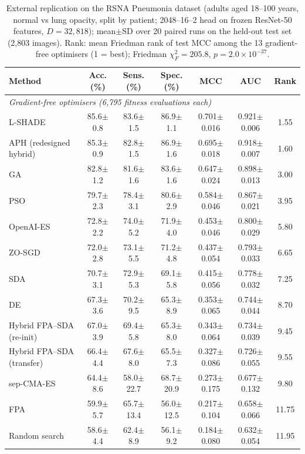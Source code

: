 \begin{table}[!t]
\centering
\caption{External replication on the RSNA Pneumonia dataset (adults aged 18--100 years, normal vs lung opacity, split by patient; 2048--16--2 head on frozen ResNet-50 features, $D=32{,}818$); mean$\pm$SD over 20 paired runs on the held-out test set (2,803 images). Rank: mean Friedman rank of test MCC among the 13 gradient-free optimisers (1 = best); Friedman $\chi^2_F=205.8$, $p=2.0\times 10^{-37}$.}
\label{tab:rsna}
\footnotesize
\setlength{\tabcolsep}{3pt}
\begin{tabular}{lcccccc}
\toprule
Method & Acc. (\%) & Sens. (\%) & Spec. (\%) & MCC & AUC & Rank \\
\midrule
\multicolumn{7}{l}{\textit{Gradient-free optimisers (6,795 fitness evaluations each)}} \\
L-SHADE & 85.6$\pm$0.8 & 83.6$\pm$1.5 & 86.9$\pm$1.1 & 0.701$\pm$0.016 & 0.921$\pm$0.006 & 1.55 \\
APH (redesigned hybrid) & 85.3$\pm$0.9 & 82.8$\pm$1.5 & 86.9$\pm$1.6 & 0.695$\pm$0.018 & 0.918$\pm$0.007 & 1.60 \\
GA & 82.8$\pm$1.2 & 81.6$\pm$1.6 & 83.6$\pm$1.6 & 0.647$\pm$0.024 & 0.898$\pm$0.013 & 3.00 \\
PSO & 79.7$\pm$2.3 & 78.4$\pm$3.1 & 80.6$\pm$2.9 & 0.584$\pm$0.046 & 0.867$\pm$0.021 & 3.95 \\
OpenAI-ES & 72.8$\pm$2.2 & 74.0$\pm$5.2 & 71.9$\pm$4.0 & 0.453$\pm$0.046 & 0.800$\pm$0.029 & 5.80 \\
ZO-SGD & 72.0$\pm$2.8 & 73.1$\pm$5.5 & 71.2$\pm$4.8 & 0.437$\pm$0.054 & 0.793$\pm$0.033 & 6.65 \\
SDA & 70.7$\pm$3.1 & 72.9$\pm$5.3 & 69.1$\pm$5.8 & 0.415$\pm$0.056 & 0.778$\pm$0.032 & 7.25 \\
DE & 67.3$\pm$3.6 & 70.2$\pm$9.5 & 65.3$\pm$8.9 & 0.353$\pm$0.065 & 0.744$\pm$0.044 & 8.70 \\
Hybrid FPA--SDA (re-init) & 67.0$\pm$3.9 & 69.4$\pm$5.8 & 65.3$\pm$8.0 & 0.343$\pm$0.064 & 0.734$\pm$0.039 & 9.45 \\
Hybrid FPA--SDA (transfer) & 66.4$\pm$4.4 & 67.6$\pm$8.0 & 65.5$\pm$7.3 & 0.327$\pm$0.086 & 0.726$\pm$0.055 & 9.55 \\
sep-CMA-ES & 64.4$\pm$8.6 & 58.0$\pm$22.7 & 68.7$\pm$20.9 & 0.273$\pm$0.175 & 0.677$\pm$0.132 & 9.80 \\
FPA & 59.9$\pm$5.7 & 65.7$\pm$13.4 & 56.0$\pm$12.5 & 0.217$\pm$0.104 & 0.658$\pm$0.066 & 11.75 \\
Random search & 58.6$\pm$4.4 & 62.4$\pm$8.9 & 56.1$\pm$9.2 & 0.184$\pm$0.080 & 0.632$\pm$0.054 & 11.95 \\

\end{tabular}
\end{table}
